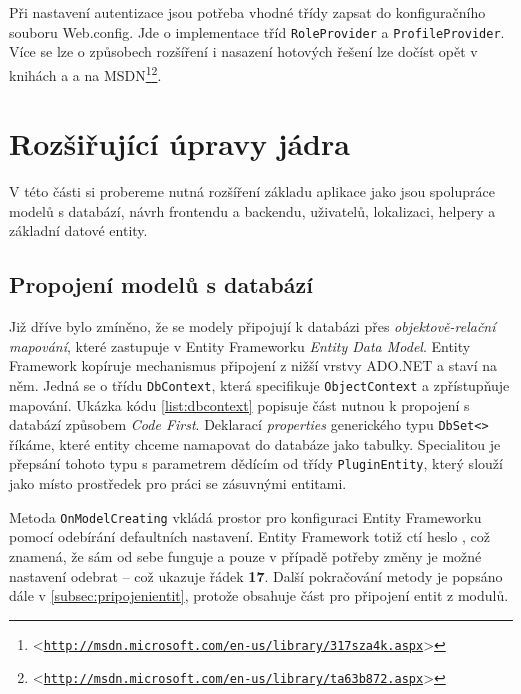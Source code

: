 \documentclass[11pt,twoside,a4paper]{book}
\let\oldUrl\url
\renewcommand\url[1]{<\texttt{\oldUrl{#1}}>}
\begin{document}
Při nastavení autentizace jsou potřeba vhodné třídy zapsat do konfiguračního souboru \textsf{Web.config}. Jde o implementace tříd \texttt{RoleProvider} a \texttt{ProfileProvider}. Více se lze o způsobech rozšíření i nasazení hotových řešení lze dočíst opět v knihách \cite{MVC1} a \cite{MVC2} a na MSDN\footnote{\url{http://msdn.microsoft.com/en-us/library/317sza4k.aspx}}\footnote{\url{http://msdn.microsoft.com/en-us/library/ta63b872.aspx}}.

\section{Rozšiřující úpravy jádra}
\label{sec:roz}
V této části si probereme nutná rozšíření základu aplikace jako jsou spolupráce modelů s databází, návrh frontendu a backendu, uživatelů, lokalizaci, helpery a základní datové entity.


\subsection{Propojení modelů s databází}
Již dříve bylo zmíněno, že se modely připojují k databázi přes \textit{objektově-relační mapování}, které zastupuje v Entity Frameworku \textit{Entity Data Model}. Entity Framework kopíruje mechanismus připojení z nižší vrstvy ADO.NET a staví na něm. Jedná se o třídu \texttt{DbContext}, která specifikuje \texttt{ObjectContext} a zpřístupňuje mapování. Ukázka kódu \ref{list:dbcontext} popisuje část nutnou k propojení s databází způsobem \textit{Code First}. Deklarací \textit{properties} generického typu \texttt{DbSet<>} říkáme, které entity chceme namapovat do databáze jako tabulky. Specialitou je přepsání tohoto typu s parametrem dědícím od třídy \texttt{PluginEntity}, který slouží jako místo prostředek pro práci se zásuvnými entitami.

Metoda \texttt{OnModelCreating} vkládá prostor pro konfiguraci Entity Frameworku pomocí odebírání defaultních nastavení. Entity Framework totiž ctí heslo , což znamená, že sám od sebe funguje a pouze v případě potřeby změny je možné nastavení odebrat -- což ukazuje řádek \textbf{17}. Další pokračování metody je popsáno dále v \ref{subsec:pripojenientit}, protože obsahuje část pro připojení entit z modulů.
\end{document}
